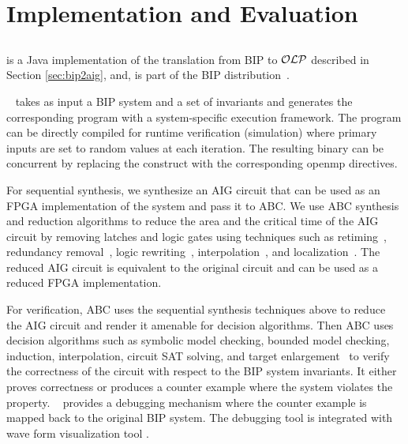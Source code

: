 \section{Implementation and Evaluation}
\label{sect-implem}

\subsection{\biptool{}} \label{chap:implementation:bip}
\biptool{} is a Java implementation of the translation from BIP to $\mathcal{OLP}$ described in Section \ref{sec:bip2aig}, and, is part of the BIP distribution~\cite{verimagbiponline}.

\biptool~ takes as input a BIP system and a set of invariants
and generates the corresponding \caig{} program with a system-specific 
execution framework. 
The \caig program can be directly compiled for runtime verification (simulation)
where primary inputs are set to random values at each iteration. 
The resulting binary can be concurrent by replacing the 
 construct with the corresponding openmp directives. 

For sequential synthesis, we synthesize an AIG 
circuit that can be used as an FPGA implementation of the system
and pass it to ABC. 
We use ABC synthesis and reduction algorithms to reduce the area and the critical
time of the AIG circuit by 
removing latches and logic gates using techniques such as 
retiming~\cite{KuBa01}, 
redundancy removal~\cite{HmBPK05,KuMP01,BjesseC00,aziz-fmsd-00}, 
logic rewriting~\cite{BjBo04}, interpolation~\cite{McMillan03}, 
and localization~\cite{Wang03}. 
The reduced AIG circuit is equivalent to the original circuit and can be used
as a reduced FPGA implementation. 


For verification, 
ABC uses the sequential synthesis techniques above to reduce the 
AIG circuit and render it amenable for decision algorithms. 
Then ABC uses decision algorithms such as 
symbolic model checking, bounded model checking, induction, 
interpolation, circuit SAT solving, 
and target enlargement~\cite{MoGS00,MoMZ01,HoSH00,BaKuAb02,Hari05expert}
to verify the correctness of the circuit with respect to the BIP system invariants.
It either proves correctness or produces a counter example where the system 
violates the property. 
\biptool~ provides a debugging mechanism where the counter example is mapped back 
to the original BIP system. 
The debugging tool is integrated with wave form visualization 
tool \cite{bybell2010gtkwave}.  

